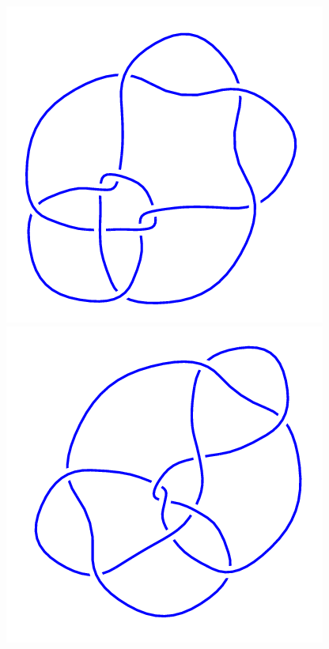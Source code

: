 \begin{figure}[H]
\begin{minipage}[b]{.18\linewidth}
	\end{minipage}
	\begin{minipage}[b]{.18\linewidth}
		\centering
		\includegraphics[width=\linewidth]{../data/10_104.png}
	\end{minipage}
	\begin{minipage}[b]{.18\linewidth}
		\centering
		\includegraphics[width=\linewidth]{../data/10_105.png}

\end{minipage}
\end{figure}
